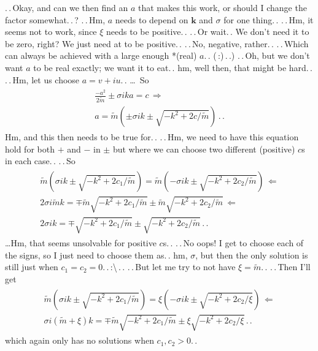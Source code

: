 \documentclass{report}
\begin{document}
.\,.\,Okay, and can we then find an $a$ that makes this work, or should I change the factor somewhat.\,.\,? .\,.\,Hm, $a$ needs to depend on $\boldsymbol{k}$ and $\sigma$ for one thing.\,. 
.\,.\,Hm, it seems not to work, since $\xi$ needs to be positive.\,. .\,.\,Or wait.\,. We don't need it to be zero, right? We just need at to be positive.\,. .\,.\,No, negative, rather.\,. .\,.\,Which can always be achieved with a large enough *(real) $a$.\,. (\,:)\,.\,.)
.\,.\,Oh, but we don't want $a$ to be real exactly; we want it to eat.\,. hm, well then, that might be hard.\,. .\,.\,Hm, let us choose $a=v+iu$.\,. 
\ldots\ So 
\begin{align}
\begin{aligned}
	\frac{-a^2}{2\tilde m} \pm 	\sigma i k a = c\,\Longrightarrow\\
	a = \tilde m (\pm \sigma i k \pm \sqrt{-k^2 + 2c/\tilde m})\,.\,.
\end{aligned}
\end{align}
Hm, and this then needs to be true for.\,. .\,.\,Hm, we need to have this equation hold for both $+$ and $-$ in $\pm$ but where we can choose two different (positive) $c$s in each case.\,. .\,.\,So
\begin{align}
\begin{aligned}
	\tilde m (  \sigma i k \pm \sqrt{-k^2 + 2c_1/\tilde m}) = 
	\tilde m (- \sigma i k \pm \sqrt{-k^2 + 2c_2/\tilde m})\, \Longleftarrow\\
	2 \sigma i \tilde m  k = 
		\mp \tilde m\sqrt{-k^2 + 2c_1/\tilde m}  
		\pm \tilde m\sqrt{-k^2 + 2c_2/\tilde m}\, \Longleftarrow\\
	2 \sigma i  k = 
		\mp \sqrt{-k^2 + 2c_1/\tilde m}  
		\pm \sqrt{-k^2 + 2c_2/\tilde m}\,.\,.
\end{aligned}
\end{align}
\ldots Hm, that seems unsolvable for positive $c$s.\,. .\,.\,No oops! I get to choose each of the signs, so I just need to choose them as.\,. hm, $\sigma$, but then the only solution is still just when $c_1 = c_2 = 0$.\,.\,:\textbackslash\,.\,. .\,.\,But let me try to not have $\xi = \tilde m$.\,. .\,.\,Then I'll get
\begin{align}
\begin{aligned}
	\tilde m (  \sigma i k \pm \sqrt{-k^2 + 2c_1/\tilde m}) = 
	\xi      (- \sigma i k \pm \sqrt{-k^2 + 2c_2/\xi})\, \Longleftarrow\\
	\sigma i (\tilde m + \xi)  k = 
		\mp \tilde m\sqrt{-k^2 + 2c_1/\tilde m}  
		\pm \xi     \sqrt{-k^2 + 2c_2/\xi}\,.\,.
\end{aligned}
\end{align}
which again only has no solutions when $c_1, c_2 > 0$.\,.
\end{document}
